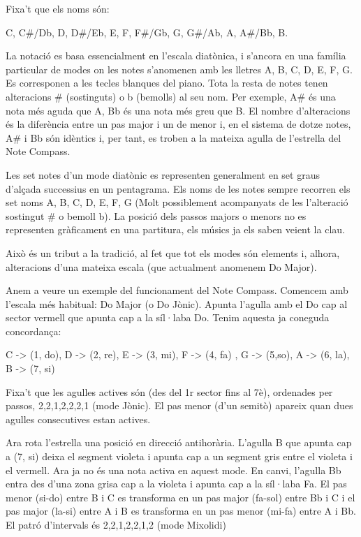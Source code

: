 Fixa't que els noms són:

C, C\#/Db, D, D\#/Eb, E, F, F\#/Gb, G, G\#/Ab, A, A\#/Bb, B.

La notació es basa essencialment en l'escala diatònica, i s'ancora en una família particular de modes on les notes s'anomenen amb les lletres A, B, C, D, E, F, G. Es corresponen a les tecles blanques del piano. Tota la resta de notes tenen alteracions \# (sostinguts) o b (bemolls) al seu nom. Per exemple, A\# és una nota més aguda que A, Bb és una nota més greu que B. El nombre d'alteracions és la diferència entre un pas major i un de menor i, en el sistema de dotze notes, A\# i Bb són idèntics i, per tant, es troben a la mateixa agulla de l'estrella del Note Compass.  

Les set notes d'un mode diatònic es representen generalment en set graus d'alçada successius en un pentagrama. Els noms de les notes sempre recorren els set noms A, B, C, D, E, F, G (Molt possiblement acompanyats de les l'alteració sostingut \# o bemoll b). La posició dels passos majors o menors no es representen gràficament en una partitura, els músics ja els saben veient la clau.

Això és un tribut a la tradició, al fet que tot els modes són elements i, alhora, alteracions d'una mateixa escala (que actualment anomenem Do Major).

Anem a veure un exemple del funcionament del Note Compass. Comencem amb l'escala més habitual: Do Major (o Do Jònic). Apunta l'agulla amb el Do cap al sector vermell que apunta cap a la síl·laba Do. Tenim aquesta ja coneguda concordança:

C -> (1, do), D -> (2, re), E -> (3, mi), F -> (4, fa) , G -> (5,so), A -> (6, la), B -> (7, si)

Fixa't que les agulles actives són (des del 1r sector fins al 7è), ordenades per passos, 2,2,1,2,2,2,1 (mode Jònic). El pas menor (d'un semitò) apareix quan dues agulles consecutives estan actives. 

Ara rota l'estrella una posició en direcció antihorària. L'agulla B que apunta cap a (7, si) deixa el segment violeta i apunta cap a un segment gris entre el violeta i el vermell. Ara ja no és una nota activa en aquest mode. En canvi, l'agulla Bb entra des d'una zona grisa cap a la violeta i apunta cap a la síl·laba Fa. El pas menor (si-do) entre B i C es transforma en un pas major (fa-sol) entre Bb i C i el pas major (la-si) entre A i B es transforma en un pas menor (mi-fa) entre A i Bb. El patró d'intervals és 2,2,1,2,2,1,2 (mode Mixolidi) 

